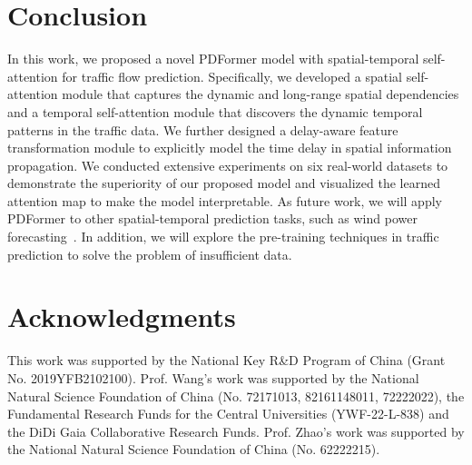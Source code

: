 \documentclass[letterpaper]{article} \usepackage{aaai23}  \usepackage{times}  \usepackage{helvet}  \usepackage{courier}  \usepackage[hyphens]{url}  \usepackage{graphicx} \urlstyle{rm} \def\UrlFont{\rm}  \usepackage{natbib}  \usepackage{caption} \frenchspacing  \setlength{\pdfpagewidth}{8.5in} \setlength{\pdfpageheight}{11in} \usepackage{algorithm}
\newcommand{\name}{PDFormer\xspace}
\begin{document}
\section{Conclusion}
In this work, we proposed a novel \name model with spatial-temporal self-attention for traffic flow prediction. Specifically, we developed a spatial self-attention module that captures the dynamic and long-range spatial dependencies and a temporal self-attention module that discovers the dynamic temporal patterns in the traffic data. We further designed a delay-aware feature transformation module to explicitly model the time delay in spatial information propagation. We conducted extensive experiments on six real-world datasets to demonstrate the superiority of our proposed model and visualized the learned attention map to make the model interpretable. As future work, we will apply \name to other spatial-temporal prediction tasks, such as wind power forecasting~\cite{jiang2018buaa_bigscity}. In addition, we will explore the pre-training techniques in traffic prediction to solve the problem of insufficient data.
\clearpage

\clearpage
\section*{Acknowledgments}
This work was supported by the National Key R\&D Program of China (Grant No. 2019YFB2102100). Prof. Wang’s work was supported by the National Natural Science Foundation of China (No. 72171013, 82161148011, 72222022), the Fundamental Research Funds for the Central Universities (YWF-22-L-838) and the DiDi Gaia Collaborative Research Funds. Prof. Zhao’s work was supported by the National Natural Science Foundation of China (No. 62222215).


\end{document}
